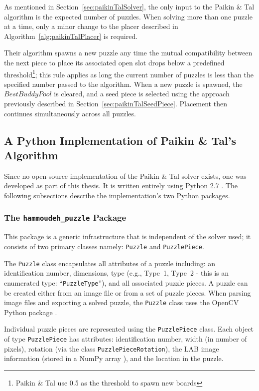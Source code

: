\documentclass{report}
\newcommand{\hammoudehPuzzlePackage}{\texttt{hammoudeh\_puzzle} }
\begin{document}
As mentioned in Section~\ref{sec:paikinTalSolver}, the only input to the Paikin \& Tal algorithm is the expected number of puzzles.   When solving more than one puzzle at a time, only a minor change to the placer described in Algorithm~\ref{alg:paikinTalPlacer} is required.

Their algorithm spawns a new puzzle any time the mutual compatibility between the next piece to place its associated open slot drops below a predefined threshold\footnote{Paikin \& Tal use 0.5 as the threshold to spawn new boards}; this rule applies as long the current number of puzzles is less than the specified number passed to the algorithm.  When a new puzzle is spawned, the $BestBuddyPool$ is cleared, and a seed piece is selected using the approach previously described in Section~\ref{sec:paikinTalSeedPiece}.   Placement then continues simultaneously across all puzzles.

\subsection{A Python Implementation of Paikin \& Tal's Algorithm}\label{sec:pythonPaikinTalAlgorithm}

Since no open-source implementation of the Paikin \& Tal solver exists, one was developed as part of this thesis.  It is written entirely using Python 2.7 \cite{python}.  The following subsections describe the implementation's two Python packages.  

\subsubsection{The \hammoudehPuzzlePackage Package}\label{sec:hammoudehPuzzlePackage}

This package is a generic infrastructure that is independent of the solver used; it consists of two primary classes namely: \texttt{Puzzle} and \texttt{PuzzlePiece}.  

The \texttt{Puzzle} class encapsulates all attributes of a puzzle including: an identification number, dimensions, type (e.g., Type~1, Type~2 - this is an enumerated type: ``\texttt{PuzzleType}''), and all associated puzzle pieces.  A puzzle can be created either from an image file or from a set of puzzle pieces.   When parsing image files and exporting a solved puzzle, the \texttt{Puzzle} class uses the OpenCV Python package \cite{opencv_library}. 

Individual puzzle pieces are represented using the \texttt{PuzzlePiece} class.  Each object of type \texttt{PuzzlePiece} has attributes: identification number, width (in number of pixels), rotation (via the class \texttt{PuzzlePieceRotation}), the LAB image information (stored in a NumPy array \cite{walt2011}), and the location in the puzzle.
\end{document}
